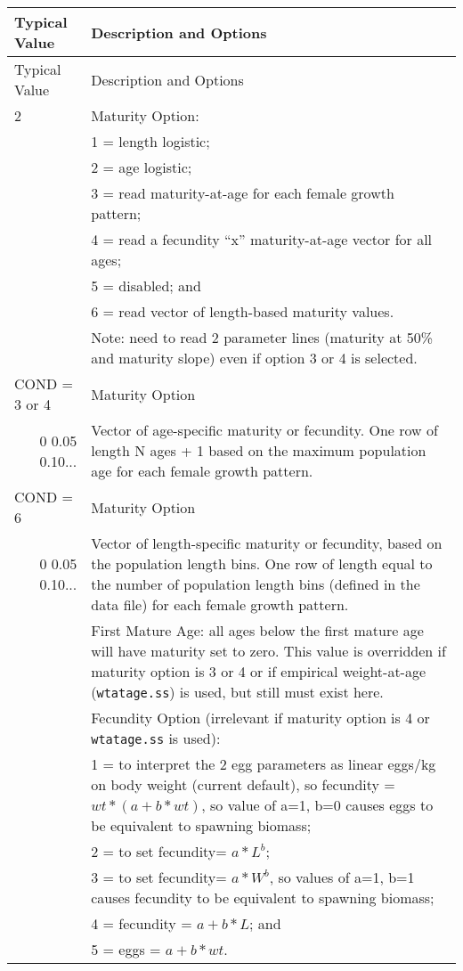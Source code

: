 \begin{longtable}{p{0.5cm} p{2cm} p{13cm}}
	\hline	
	\multicolumn{2}{l}{Typical Value} & Description and Options \Tstrut\Bstrut\\
	\hline
	\endfirsthead

	\hline
	\multicolumn{2}{l}{Typical Value} & Description and Options \Tstrut\Bstrut\\
	\hline
	\endhead
	\hline

	\endfoot
	
	\endlastfoot

	2 & & Maturity Option: \Tstrut\\
	  & & 1 = length logistic; \\
	  & & 2 = age logistic; \\
	  & & 3 = read maturity-at-age for each female growth pattern; \\
	  & & 4 = read a fecundity ``x'' maturity-at-age vector for all ages; \\
	  & & 5 = disabled; and \\
	  & & 6 = read vector of length-based maturity values. \\
	  & & Note: need to read 2 parameter lines (maturity at 50\% and maturity slope) even if option 3 or 4 is selected. \Bstrut\\
	\hline

	\multicolumn{2}{l}{COND = 3 or 4} & Maturity Option \Tstrut\\
	\multicolumn{2}{r}{0 0.05 0.10...} & Vector of age-specific maturity or fecundity. One row of length N ages + 1 based on the maximum population age for each female growth pattern. \Bstrut\\
	\multicolumn{2}{l}{COND = 6} & Maturity Option \Tstrut\\
	\multicolumn{2}{r}{0 0.05 0.10...} & Vector of length-specific maturity or fecundity, based on the population length bins. One row of length equal to the number of population length bins (defined in the data file) for each female growth pattern. \Bstrut\\
	\hline
	
	\Tstrut 1 & & First Mature Age: all ages below the first mature age will have maturity set to zero. This value is overridden if maturity option is 3 or 4 or if empirical weight-at-age (\texttt{wtatage.ss}) is used, but still must exist here. \Bstrut\\
	\hline

	\Tstrut 1 & & Fecundity Option (irrelevant if maturity option is 4 or \texttt{wtatage.ss} is used): \\
	  & & 1 = to interpret the 2 egg parameters as linear eggs/kg on body weight (current default), so fecundity = $wt*(a+b*wt)$, so value of a=1, b=0 causes eggs to be equivalent to spawning biomass; \\
	  & & 2 = to set fecundity= $a*L^b$; \\
	  & & 3 = to set fecundity= $a*W^b$, so values of a=1, b=1 causes fecundity to be equivalent to spawning biomass; \\
	  & & 4 = fecundity = $a+b*L$; and \\
	  & & 5 = eggs = $a+b*wt$. \Bstrut\\
	\hline
\end{longtable}

